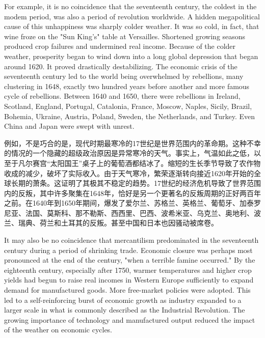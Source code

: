 \begin{Parallel}{97mm}{45mm}
  \ParallelLText
  {For example, it is no coincidence that the seventeenth century, the coldest in the modem period, was also a period of revolution worldwide. A hidden megapolitical cause of this unhappiness was sharply colder weather. It was so cold, in fact, that wine froze on the "Sun King's" table at Versailles. Shortened growing seasons produced crop failures and undermined real income. Because of the colder weather, prosperity began to wind down into a long global depression that began around 1620. It proved drastically destabilizing. The economic crisis of the seventeenth century led to the world being overwhelmed by rebellions, many clustering in 1648, exactly two hundred years before another and more famous cycle of rebellions. Between 1640 and 1650, there were rebellions in Ireland, Scotland, England, Portugal, Catalonia, France, Moscow, Naples, Sicily, Brazil, Bohemia, Ukraine, Austria, Poland, Sweden, the Netherlands, and Turkey. Even China and Japan were swept with unrest.}
  
  \ParallelRText
  {例如，不是巧合的是，现代时期最寒冷的17世纪是世界范围内的革命期。这种不幸的情况的一个隐藏的超级政治原因是异常寒冷的天气。事实上，气温如此之低，以至于凡尔赛宫“太阳国王”桌子上的葡萄酒都结冰了。缩短的生长季节导致了农作物收成的减少，破坏了实际收入。由于天气寒冷，繁荣逐渐转向接近1620年开始的全球长期的萧条。这证明了其极其不稳定的趋势。17世纪的经济危机导致了世界范围内的反叛，其中许多聚集在1648年，恰好是另一个更著名的反叛周期的正好两百年之前。在1640年到1650年期间，爆发了爱尔兰、苏格兰、英格兰、葡萄牙、加泰罗尼亚、法国、莫斯科、那不勒斯、西西里、巴西、波希米亚、乌克兰、奥地利、波兰、瑞典、荷兰和土耳其的反叛。甚至中国和日本也因骚动被席卷。}
  \ParallelPar



  \ParallelLText
  {It may also be no coincidence that mercantilism predominated in the seventeenth century during a period of shrinking trade. Economic closure was perhaps most pronounced at the end of the century, "when a terrible famine occurred." By the eighteenth century, especially after 1750, warmer temperatures and higher crop yields had begun to raise real incomes in Western Europe sufficiently to expand demand for manufactured goods. More free-market policies were adopted. This led to a self-reinforcing burst of economic growth as industry expanded to a larger scale in what is commonly described as the Industrial Revolution. The growing importance of technology and manufactured output reduced the impact of the weather on economic cycles.}
  

\end{Parallel}
